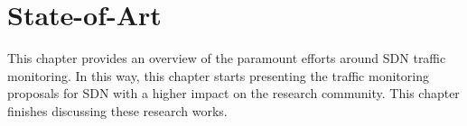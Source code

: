 \chapter{State-of-Art}
\label{sec:state-of-art}

This chapter provides an overview of the paramount efforts around SDN traffic monitoring. In this way, this chapter starts presenting the traffic monitoring proposals for SDN with a higher impact on the research community. This chapter finishes discussing these research works.


